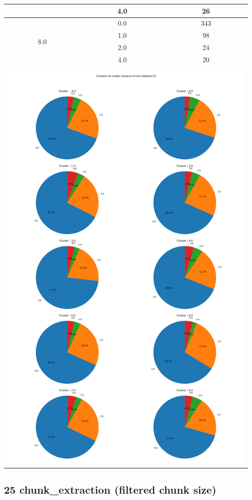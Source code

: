 \begin{longtable}{|c|c|c|c|c|}
& \multicolumn{2}{c|}{4.0} & \multicolumn{2}{c|}{26} \\
\hline
\multirow{4}{*}{8.0} & \multicolumn{2}{c|}{0.0} & \multicolumn{2}{c|}{343} \\
& \multicolumn{2}{c|}{1.0} & \multicolumn{2}{c|}{98} \\
& \multicolumn{2}{c|}{2.0} & \multicolumn{2}{c|}{24} \\
& \multicolumn{2}{c|}{4.0} & \multicolumn{2}{c|}{20} \\
\hline
\multicolumn{5}{|c|}{\includegraphics[width=0.8\linewidth]{img/annexes/23/clustering_pie_charts/single instance.png}} \\
\end{longtable}


\subsection{25 chunk\_extraction (filtered chunk size)}


